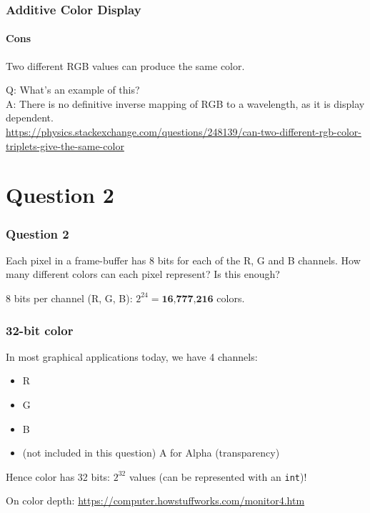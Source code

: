 \documentclass{beamer}
\begin{document}
\begin{frame}
    \frametitle{Additive Color Display}
    \framesubtitle{Cons}

    Two different RGB values can produce the same color.\\

    \begin{tcolorbox}
        Q: What's an example of this?\\

        A: There is no definitive inverse mapping of RGB to a wavelength, as it is display dependent. \\
        {\tiny \url{https://physics.stackexchange.com/questions/248139/can-two-different-rgb-color-triplets-give-the-same-color}}
    \end{tcolorbox}
    
\end{frame}

\section{Question 2}

\begin{frame}
    \frametitle{Question 2}

    Each pixel in a frame-buffer has 8 bits for each of the R, G and B channels. How many different
    colors can each pixel represent? Is this enough?

    \begin{tcolorbox}
        8 bits per channel (R, G, B): $2^{24} = \textbf{16,777,216}$ colors. 
    \end{tcolorbox}

\end{frame}

\begin{frame}
    \frametitle{32-bit color}

    In most graphical applications today, we have 4 channels:
    \begin{itemize}
        \item R
        \item G
        \item B
        \item (not included in this question) A for Alpha (transparency)
    \end{itemize}

    Hence color has 32 bits: $2^{32}$ values (can be represented with an \texttt{int})!

    On color depth: \url{https://computer.howstuffworks.com/monitor4.htm}

\end{frame}
\end{document}

